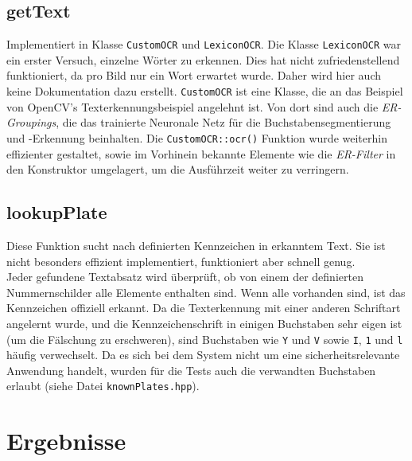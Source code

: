 \documentclass{../Vorlage/sebDenCls}
\begin{document}
\subsection{getText}
Implementiert in Klasse \texttt{CustomOCR} und \texttt{LexiconOCR}.
Die Klasse \texttt{LexiconOCR} war ein erster Versuch, einzelne Wörter zu erkennen. Dies hat nicht zufriedenstellend funktioniert, da pro Bild nur ein Wort erwartet wurde. Daher wird hier auch keine Dokumentation dazu erstellt.
\texttt{CustomOCR} ist eine Klasse, die an das Beispiel von OpenCV's Texterkennungsbeispiel angelehnt ist. Von dort sind auch die \textit{ER-Groupings}, die das trainierte Neuronale Netz für die Buchstabensegmentierung und -Erkennung beinhalten. Die \texttt{CustomOCR::ocr()} Funktion wurde weiterhin effizienter gestaltet, sowie im Vorhinein bekannte Elemente wie die \textit{ER-Filter} in den Konstruktor umgelagert, um die Ausführzeit weiter zu verringern.



\subsection{lookupPlate}
\label{lookupPlate}
Diese Funktion sucht nach definierten Kennzeichen in erkanntem Text. Sie ist nicht besonders effizient implementiert, funktioniert aber schnell genug.\\
Jeder gefundene Textabsatz wird überprüft, ob von einem der definierten Nummernschilder alle Elemente enthalten sind. Wenn alle vorhanden sind, ist das Kennzeichen offiziell erkannt. Da die Texterkennung mit einer anderen Schriftart angelernt wurde, und die Kennzeichenschrift in einigen Buchstaben sehr eigen ist (um die Fälschung zu erschweren), sind Buchstaben wie \texttt{Y} und \texttt{V} sowie \texttt{I}, \texttt{1} und \texttt{l} häufig verwechselt. Da es sich bei dem System nicht um eine sicherheitsrelevante Anwendung handelt, wurden für die Tests auch die verwandten Buchstaben erlaubt (siehe Datei \texttt{knownPlates.hpp}).


\section{Ergebnisse}
\end{document}
